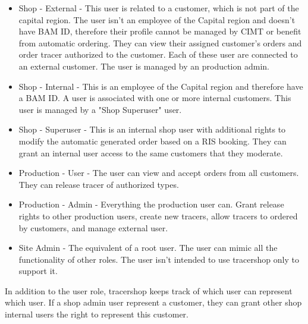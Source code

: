 \documentclass{article}
\begin{document}
\begin{itemize}
  \item Shop - External - This user is related to a customer, which is not part
  of the capital region. The user isn't an employee of the Capital region and
  doesn't have BAM ID, therefore their profile cannot be managed by CIMT or
  benefit from automatic ordering.
  They can view their assigned customer's orders and order tracer authorized to
  the customer.
  Each of these user are connected to an external customer. The user is managed
  by an production admin.
  \item Shop - Internal - This is an employee of the Capital region and
  therefore have a BAM ID. A user is associated with one or more internal
  customers. This user is managed by a "Shop Superuser" user.
  \item Shop - Superuser - This is an internal shop user with additional rights
  to modify the automatic generated order based on a RIS booking.
  They can grant an internal user access to the same customers that they
  moderate.
  \item Production - User - The user can view and accept orders from all
  customers. They can release tracer of authorized types.
  \item Production - Admin - Everything the production user can. Grant release
  rights to other production users, create new tracers, allow tracers to ordered
  by customers, and manage external user.
  \item Site Admin - The equivalent of a root user. The user can mimic all the
  functionality of other roles. The user isn't intended to use tracershop only
  to support it.
\end{itemize}

In addition to the user role, tracershop keeps track of which user can represent
which user. If a shop admin user represent a customer, they can grant other
shop internal users the right to represent this customer.
\end{document}
